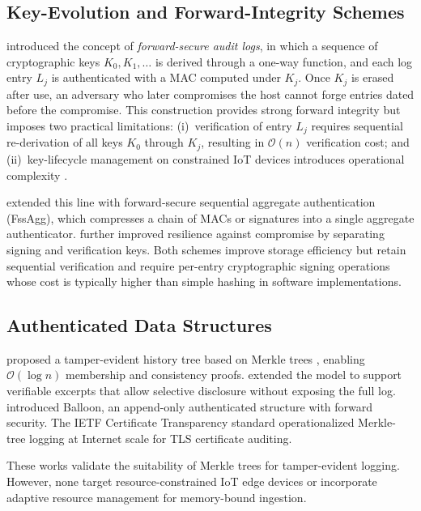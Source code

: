 \documentclass[preprint,12pt]{elsarticle}
\begin{document}
\subsection{Key-Evolution and Forward-Integrity Schemes}

\citet{schneier1999secure} introduced the concept of \emph{forward-secure audit logs}, in which a sequence of cryptographic keys $K_0, K_1, \ldots$ is derived through a one-way function, and each log entry $L_j$ is authenticated with a MAC computed under $K_j$.
Once $K_j$ is erased after use, an adversary who later compromises the host cannot forge entries dated before the compromise.
This construction provides strong forward integrity but imposes two practical limitations: (i)~verification of entry $L_j$ requires sequential re-derivation of all keys $K_0$ through $K_j$, resulting in $\mathcal{O}(n)$ verification cost; and (ii)~key-lifecycle management on constrained IoT devices introduces operational complexity \citep{nist2020iot}.

\citet{ma2009new} extended this line with forward-secure sequential aggregate authentication (FssAgg), which compresses a chain of MACs or signatures into a single aggregate authenticator.
\citet{yavuz2012efficient} further improved resilience against compromise by separating signing and verification keys.
Both schemes improve storage efficiency but retain sequential verification and require per-entry cryptographic signing operations whose cost is typically higher than simple hashing in software implementations.

\subsection{Authenticated Data Structures}

\citet{crosby2009efficient} proposed a tamper-evident history tree based on Merkle trees \citep{merkle1987digital}, enabling $\mathcal{O}(\log n)$ membership and consistency proofs.
\citet{hartung2016secure} extended the model to support verifiable excerpts that allow selective disclosure without exposing the full log.
\citet{pulls2015balloon} introduced Balloon, an append-only authenticated structure with forward security.
The IETF Certificate Transparency standard \citep{rfc9162} operationalized Merkle-tree logging at Internet scale for TLS certificate auditing.

These works validate the suitability of Merkle trees for tamper-evident logging.
However, none target resource-constrained IoT edge devices or incorporate adaptive resource management for memory-bound ingestion.
\end{document}
